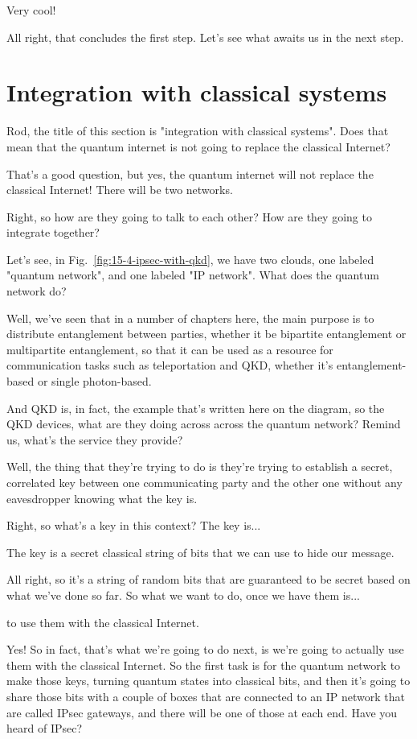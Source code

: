 \mmm Very cool!

All right, that concludes the first step. Let's see what awaits us in the next step.

\section{Integration with classical systems}
\label{sec:classical-integration}

\mmm Rod, the title of this section is "integration with classical systems". Does that mean that the quantum internet is not going to replace the classical Internet?

\rrr That's a good question, but yes, the quantum internet will not replace the classical Internet! There will be two networks.

\mmm Right, so how are they going to talk to each other? How are they going to integrate together?

\rrr Let's see, in Fig.~\ref{fig:15-4-ipsec-with-qkd}, we have two clouds, one labeled "quantum network", and one labeled "IP network". What does the quantum network do?

\mmm Well, we've seen that in a number of chapters here, the main purpose is to distribute entanglement between parties, whether it be bipartite entanglement or multipartite entanglement, so that it can be used as a resource for communication tasks such as teleportation and QKD, whether it's entanglement-based or single photon-based.

\rrr And QKD is, in fact, the example that's written here on the diagram, so the QKD devices, what are they doing across across the quantum network? Remind us, what's the service they provide?

\mmm Well, the thing that they're trying to do is they're trying to establish a secret, correlated key between one communicating party and the other one without any eavesdropper knowing what the key is.

\rrr Right, so what's a key in this context? The key is...

\mmm The key is a secret classical string of bits that we can use to hide our message.

\rrr All right, so it's a string of random bits that are guaranteed to be secret based on what we've done so far. So what we want to do, once we have them is...

\mmm to use them with the classical Internet.

\rrr Yes! So in fact, that's what we're going to do next, is we're going to actually use them with the classical Internet. So the first task is for the quantum network to make those keys, turning quantum states into classical bits, and then it's going to share those bits with a couple of boxes that are connected to an IP network that are called IPsec gateways, and there will be one of those at each end. Have you heard of IPsec?

